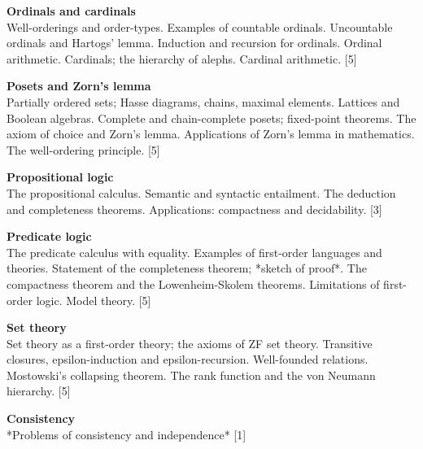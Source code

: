 \documentclass[a4paper]{article}
\begin{document}
\maketitle
{\small
  \noindent\textbf{Ordinals and cardinals}\\
  Well-orderings and order-types. Examples of countable ordinals. Uncountable ordinals and Hartogs' lemma. Induction and recursion for ordinals. Ordinal arithmetic. Cardinals; the hierarchy of alephs. Cardinal arithmetic.\hspace*{\fill} [5]

  \vspace{10pt}
  \noindent\textbf{Posets and Zorn's lemma}\\
  Partially ordered sets; Hasse diagrams, chains, maximal elements. Lattices and Boolean algebras. Complete and chain-complete posets; fixed-point theorems. The axiom of choice and Zorn's lemma. Applications of Zorn's lemma in mathematics. The well-ordering principle.\hspace*{\fill} [5]

  \vspace{10pt}
  \noindent\textbf{Propositional logic}\\
  The propositional calculus. Semantic and syntactic entailment. The deduction and completeness theorems. Applications: compactness and decidability.\hspace*{\fill} [3]

  \vspace{10pt}
  \noindent\textbf{Predicate logic}\\
  The predicate calculus with equality. Examples of first-order languages and theories. Statement of the completeness theorem; *sketch of proof*. The compactness theorem and the Lowenheim-Skolem theorems. Limitations of first-order logic. Model theory.\hspace*{\fill} [5]

  \vspace{10pt}
  \noindent\textbf{Set theory}\\ Set theory as a first-order theory; the axioms of ZF set theory. Transitive closures, epsilon-induction and epsilon-recursion. Well-founded relations. Mostowski's collapsing theorem. The rank function and the von Neumann hierarchy.\hspace*{\fill} [5]

  \vspace{10pt}
  \noindent\textbf{Consistency}\\
  *Problems of consistency and independence*\hspace*{\fill} [1]}
\end{document}
